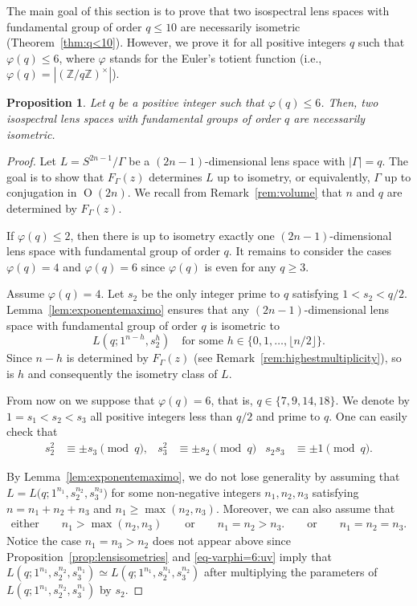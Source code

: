 \documentclass[12pt,a4paper,final]{amsart}
\theoremstyle{plain}
\newtheorem{proposition}[theorem]{Proposition}
\theoremstyle{definition}
\theoremstyle{remark}
\numberwithin{equation}{section}
\newcommand{\Z}{\mathbb Z}
\DeclareMathOperator{\Ot}{O}
\begin{document}
The main goal of this section is to prove that two isospectral lens spaces with fundamental group of order $q\leq 10$ are necessarily isometric (Theorem~\ref{thm:q<10}). 
However, we prove it for all positive integers $q$ such that $\varphi(q)\leq 6$, where $\varphi$ stands for the Euler's totient function (i.e., $\varphi(q)=|(\Z/q\Z)^\times|$). 




\begin{proposition}\label{prop:varphi(q)<=6}
Let $q$ be a positive integer such that $\varphi(q)\leq 6$.
Then, two isospectral lens spaces with fundamental groups of order $q$ are necessarily isometric. 
\end{proposition}

\begin{proof}
Let $L=S^{2n-1}/\Gamma$ be a $(2n-1)$-dimensional lens space with $|\Gamma|=q$. 
The goal is to show that $F_{\Gamma}(z)$ determines $L$ up to isometry, or equivalently, $\Gamma$ up to conjugation in $\Ot(2n)$. 
We recall from Remark~\ref{rem:volume} that $n$ and $q$ are determined by $F_{\Gamma}(z)$. 

If $\varphi(q)\leq 2$, then there is up to isometry exactly one $(2n-1)$-dimensional lens space with fundamental group of order $q$.  
It remains to consider the cases $\varphi(q)=4$ and $\varphi(q)=6$ since $\varphi(q)$ is even for any $q\geq3$. 

Assume $\varphi(q)=4$. 
Let $s_2$ be the only integer prime to $q$ satisfying $1<s_2<q/2$. 
Lemma~\ref{lem:exponentemaximo} ensures that any $(2n-1)$-dimensional lens space with fundamental group of order $q$ is isometric to 
$$
L(q;1^{n-h},s_2^{h})
\quad 
\text{for some }h\in\{0,1,\dots,\lfloor n/2\rfloor\}.
$$
Since $n-h$ is determined by $F_{\Gamma}(z)$ (see Remark~\ref{rem:highestmultiplicity}), so is $h$ and consequently the isometry class of $L$. 

From now on we suppose that $\varphi(q)=6$, that is, $q\in\{7,9,14,18\}$. 
We denote by $1=s_1<s_2<s_{3}$ all positive integers less than $q/2$ and prime to $q$. 
One can easily check that 
\begin{align}\label{eq-varphi=6:uv}
s_2^2&\equiv \pm s_3\pmod q,&
s_3^2&\equiv \pm s_2\pmod q&
s_2s_3&\equiv \pm 1\pmod q.
\end{align}


By Lemma~\ref{lem:exponentemaximo}, we do not lose generality by assuming that 
$
L=L\big(q;1^{n_1}, s_2^{n_2},s_{3}^{n_{3}}\big)
$
for some non-negative integers $n_1,n_2,n_{3}$ satisfying $n=n_1+n_2+n_{3}$ and $n_1\geq\max(n_2,n_{3})$.
Moreover, we can also assume that
\begin{align}\label{eq-varphi=6:conditions}
\text{either}\qquad
n_1>\max(n_2,n_3)
\qquad\text{or}\qquad 
n_1=n_2> n_3.
\qquad\text{or}\qquad 
n_1=n_2=n_3.
\end{align}
Notice the case $n_1=n_3>n_2$ does not appear above since Proposition~\ref{prop:lensisometries} and \eqref{eq-varphi=6:uv} imply that $L(q;1^{n_1},s_2^{n_2},s_3^{n_1})\simeq L(q;1^{n_1}, s_2^{n_1},s_3^{n_2})$ after multiplying the parameters of $L(q;1^{n_1},s_2^{n_2},s_3^{n_1})$ by $s_2$. 



\end{proof}
\end{document}
